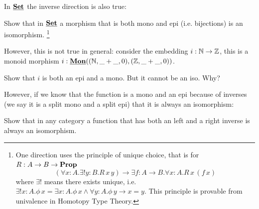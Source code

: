 In $\underline{\mathbf{\mathbf{Set}}}$ the inverse direction is also true: 
\begin{Exercise}
  Show that in $\underline{\mathbf{\mathbf{Set}}}$ a morphism that is both mono and epi (i.e. bijections) is an isomorphism.
\footnote{One direction uses the principle of unique choice, that is for $R : A \to B \to \mathbf{Prop}$~
\[(\forall x:A.\exists! y:B .R\,x\,y) \to \exists f :A \to B . \forall x:A.R\,x\,(f\,x) \]
where $\exists!$ means there exists unique, i.e. $\exists! x:A.\phi\,x = \exists x:A.\phi\,x \wedge \forall y:A.\phi\,y \to x=y$. This principle is provable from univalence in Homotopy Type Theory.} 
\end{Exercise}
However, this is not true in general: consider the embedding $i : \mathbb{N} \to \mathbb{Z}$, this is a monoid morphism $i : \underline{\mathbf{Mon}}((\mathbb{N},\_+\_,0),(\mathbb{Z},\_+\_,0))$. 
\begin{Exercise}
  Show that $i$ is both an epi and a mono. But it cannot be an iso. Why?
\end{Exercise}
However, if we know that the function is a mono and an epi because of inverses (we say it is a split mono and a split epi) that it is always an isomorphism:
\begin{Exercise}
  Show that in any category a function that has both an left and a right inverse is always an isomorphism.
\end{Exercise}




